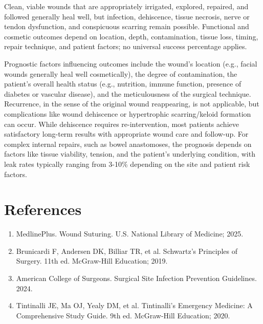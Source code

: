 Clean, viable wounds that are appropriately irrigated, explored, repaired, and followed generally heal well, but infection, dehiscence, tissue necrosis, nerve or tendon dysfunction, and conspicuous scarring remain possible. Functional and cosmetic outcomes depend on location, depth, contamination, tissue loss, timing, repair technique, and patient factors; no universal success percentage applies.

Prognostic factors influencing outcomes include the wound's location (e.g., facial wounds generally heal well cosmetically), the degree of contamination, the patient's overall health status (e.g., nutrition, immune function, presence of diabetes or vascular disease), and the meticulousness of the surgical technique. Recurrence, in the sense of the original wound reappearing, is not applicable, but complications like wound dehiscence or hypertrophic scarring/keloid formation can occur. While dehiscence requires re-intervention, most patients achieve satisfactory long-term results with appropriate wound care and follow-up. For complex internal repairs, such as bowel anastomoses, the prognosis depends on factors like tissue viability, tension, and the patient's underlying condition, with leak rates typically ranging from 3-10\% depending on the site and patient risk factors.

\section*{References}
\begin{enumerate}
  \item MedlinePlus. Wound Suturing. U.S. National Library of Medicine; 2025.
  
  \item Brunicardi F, Andersen DK, Billiar TR, et al. Schwartz's Principles of Surgery. 11th ed. McGraw-Hill Education; 2019.
  
  \item American College of Surgeons. Surgical Site Infection Prevention Guidelines. 2024.
  
  \item Tintinalli JE, Ma OJ, Yealy DM, et al. Tintinalli's Emergency Medicine: A Comprehensive Study Guide. 9th ed. McGraw-Hill Education; 2020.
\end{enumerate}

\clearpage
